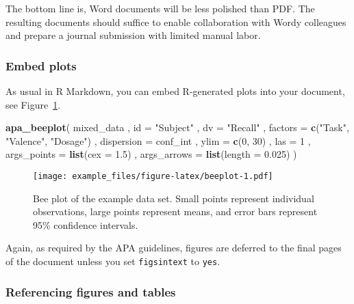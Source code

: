 \documentclass[english,man,floatsintext]{apa6}
\newenvironment{Shaded}{\begin{snugshade}}{\end{snugshade}}
\newcommand{\DataTypeTok}[1]{\textcolor[rgb]{0.13,0.29,0.53}{#1}}
\newcommand{\DecValTok}[1]{\textcolor[rgb]{0.00,0.00,0.81}{#1}}
\newcommand{\FloatTok}[1]{\textcolor[rgb]{0.00,0.00,0.81}{#1}}
\newcommand{\KeywordTok}[1]{\textcolor[rgb]{0.13,0.29,0.53}{\textbf{#1}}}
\newcommand{\NormalTok}[1]{#1}
\newcommand{\StringTok}[1]{\textcolor[rgb]{0.31,0.60,0.02}{#1}}
\begin{document}
The bottom line is, Word documents will be less polished than PDF.
The resulting documents should suffice to enable collaboration with Wordy colleagues and prepare a journal submission with limited manual labor.

\hypertarget{embed-plots}{%
\subsubsection{Embed plots}\label{embed-plots}}

As usual in R Markdown, you can embed R-generated plots into your document, see Figure~\ref{fig:beeplot}.



\begin{Shaded}
\begin{Highlighting}[]
\KeywordTok{apa_beeplot}\NormalTok{(}
\NormalTok{  mixed_data}
\NormalTok{  , }\DataTypeTok{id =} \StringTok{"Subject"}
\NormalTok{  , }\DataTypeTok{dv =} \StringTok{"Recall"}
\NormalTok{  , }\DataTypeTok{factors =} \KeywordTok{c}\NormalTok{(}\StringTok{"Task"}\NormalTok{, }\StringTok{"Valence"}\NormalTok{, }\StringTok{"Dosage"}\NormalTok{)}
\NormalTok{  , }\DataTypeTok{dispersion =}\NormalTok{ conf_int}
\NormalTok{  , }\DataTypeTok{ylim =} \KeywordTok{c}\NormalTok{(}\DecValTok{0}\NormalTok{, }\DecValTok{30}\NormalTok{)}
\NormalTok{  , }\DataTypeTok{las =} \DecValTok{1}
\NormalTok{  , }\DataTypeTok{args_points =} \KeywordTok{list}\NormalTok{(}\DataTypeTok{cex =} \FloatTok{1.5}\NormalTok{)}
\NormalTok{  , }\DataTypeTok{args_arrows =} \KeywordTok{list}\NormalTok{(}\DataTypeTok{length =} \FloatTok{0.025}\NormalTok{)}
\NormalTok{)}
\end{Highlighting}
\end{Shaded}

\begin{figure}
\centering
\texttt{[image: example\_files/figure-latex/beeplot-1.pdf]}
\caption{\label{fig:beeplot}Bee plot of the example data set. Small points represent individual observations, large points represent means, and error bars represent 95\% confidence intervals.}
\end{figure}

Again, as required by the APA guidelines, figures are deferred to the final pages of the document unless you set \texttt{figsintext} to \texttt{yes}.

\hypertarget{referencing-figures-and-tables}{%
\subsubsection{Referencing figures and tables}\label{referencing-figures-and-tables}}
\end{document}
